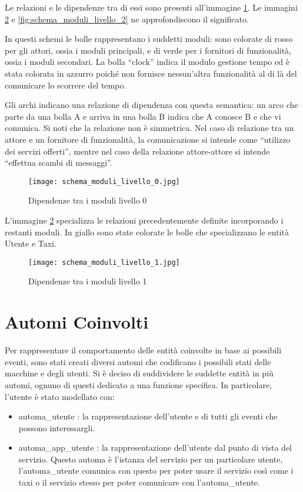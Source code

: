Le relazioni e le dipendenze tra di essi sono presenti all'immagine \ref{fig:schema_moduli_livello_0}. Le immagini \ref{fig:schema_moduli_livello_1} e \ref{fig:schema_moduli_livello_2} ne approfondiscono il significato.

In questi schemi le bolle rappresentano i suddetti moduli: sono colorate di rosso per gli attori, ossia i moduli principali, e di verde per i fornitori di funzionalità, ossia i moduli secondari. La bolla ``clock'' indica il modulo gestione tempo ed è stata colorata in azzurro  poiché non fornisce nessun'altra funzionalità al di là del comunicare lo scorrere del tempo.  

Gli archi indicano una relazione di dipendenza con questa semantica: un arco che parte da una bolla A e arriva in una bolla B indica che A conosce B e che vi comunica. Si noti che la relazione non è simmetrica. Nel caso di relazione tra un attore e un fornitore di funzionalità, la comunicazione si intende come ``utilizzo dei servizi offerti'', mentre nel caso della relazione attore-attore si intende ``effettua scambi di messaggi''.

\begin{figure}[htbp]
	\centering
	\texttt{[image: schema\_moduli\_livello\_0.jpg]}
	\caption{Dipendenze tra i moduli livello 0}
	\label{fig:schema_moduli_livello_0}
\end{figure}


L'immagine \ref{fig:schema_moduli_livello_1} specializza le relazioni precedentemente definite incorporando i restanti moduli. In giallo sono state colorate le bolle che specializzano le entità Utente e Taxi.

\begin{figure}[htbp]
	\centering
	\texttt{[image: schema\_moduli\_livello\_1.jpg]}
	\caption{Dipendenze tra i moduli livello 1}
	\label{fig:schema_moduli_livello_1}
\end{figure}

\newpage

\section{Automi Coinvolti} \label{automi}

Per rappresentare il comportamento delle entità coinvolte in base ai possibili eventi, sono stati creati diversi automi che codificano i possibili stati delle macchine e degli utenti. 
Si è deciso di suddividere le suddette entità in più automi, ognuno di questi dedicato a una funzione specifica. 
In particolare, l'utente è stato modellato con:
\begin{itemize} 
 \item automa\_utente : la rappresentazione dell'utente e di tutti gli eventi che possono interessargli.
 \item automa\_app\_utente : la rappresentazione dell'utente dal punto di vista del servizio. Questo automa è l'istanza del servizio per un particolare utente, l'automa\_utente comunica con questo per poter usare il servizio così come i taxi o il servizio stesso per poter comunicare con l'automa\_utente.
\end{itemize}

